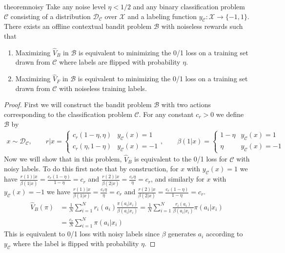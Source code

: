 \begin{subappendices}
\begin{restatable}{theorem}{noisy}\label{thm:noisy}
Take any noise level $ \eta < 1/2$ and any binary classification problem $ \mathcal{C}$ consisting of a distribution $\mathcal{D}_\mathcal{C}$ over $ \mathcal{X}$ and a labeling function $ y_{\mathcal{C}}: \mathcal{X} \to \{-1,1\}$.
There exists an offline contextual bandit problem $ \mathcal{B}$ with noiseless rewards such that
\begin{enumerate}
    \item Maximizing $ \hat V_B$ in $\mathcal{B}$ is equivalent to minimizing the 0/1 loss on a training set drawn from $ \mathcal{C}$ where labels are flipped with probability $ \eta$.
    \item Maximizing $ \hat V_F$ in $\mathcal{B}$ is equivalent to minimizing the 0/1 loss on a training set drawn from $ \mathcal{C}$ with noiseless training labels.
\end{enumerate}
\end{restatable}

\begin{proof}
First we will construct the bandit problem $ \mathcal{B}$ with two actions corresponding to the classification problem $ \mathcal{C}$.
For any constant $ c_r > 0 $ we define $ \mathcal{B}$ by
\begin{align}
    x \sim \mathcal{D}_{\mathcal{C}}, \qquad r|x = \begin{cases}c_r(1-\eta, \eta) & y_\mathcal{C}(x) = 1\\ c_r(\eta, 1-\eta) & y_\mathcal{C}(x) = -1\end{cases}, \qquad \beta(1|x) = \begin{cases}1-\eta & y_\mathcal{C}(x) = 1\\ \eta & y_\mathcal{C}(x) = -1\end{cases}
\end{align}
Now we will show that in this problem, $ \hat V_B$ is equivalent to the 0/1 loss for $ \mathcal{C}$ with noisy labels. To do this first note that by construction, for $ x $ with $ y_\mathcal{C}(x) = 1$ we have $ \frac{r(1)|x}{\beta(1|x)} = \frac{c_r(1-\eta)}{1-\eta} = c_r$ and $ \frac{r(2)|x}{\beta(2|x)} = \frac{c_r\eta}{\eta} = c_r$, and similarly for $ x $ with $ y_\mathcal{C}(x) = -1$ we have $ \frac{r(1)|x}{\beta(1|x)} = \frac{c_r\eta}{\eta} = c_r$ and $ \frac{r(2)|x}{\beta(2|x)} = \frac{c_r(1-\eta)}{1-\eta} = c_r$.
\begin{align}
    \hat V_B(\pi) &= \frac{1}{N} \sum_{i=1}^N r_i(a_i) \frac{\pi(a_i|x_i)}{\beta(a_i|x_i)} = \frac{1}{N} \sum_{i=1}^N  \frac{r_i(a_i)}{\beta(a_i|x_i)} \pi(a_i|x_i) \\
    &= \frac{c_r}{N} \sum_{i=1}^N  \pi(a_i|x_i)
\end{align}
This is equivalent to 0/1 loss with noisy labels since $ \beta$ generates $ a_i$ according to $ y_\mathcal{C}$ where the label is flipped with probability $ \eta$.


\end{proof}
\end{subappendices}
